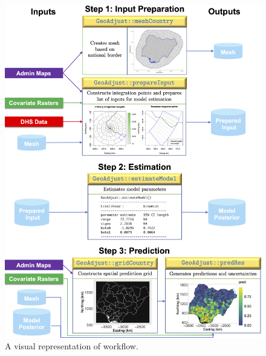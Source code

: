 \begin{figure}
\centering
\includegraphics[width=\textwidth]{workflowVert.png}
\caption{A visual representation of  workflow.}
\label{fig:workflow}
\end{figure}

